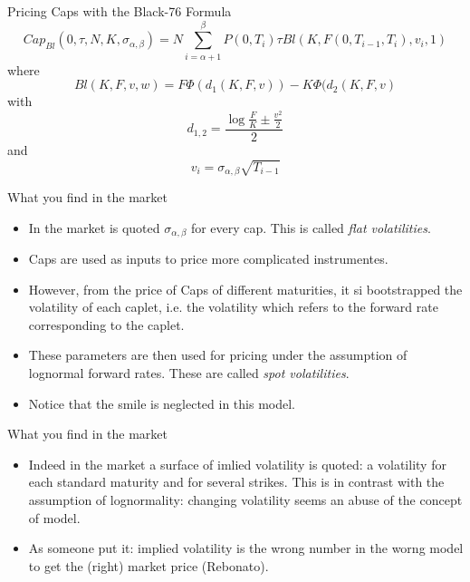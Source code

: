 \documentclass{beamer}
\begin{document}
\begin{frame}{Pricing Caps with the Black-76 Formula}
	\begin{equation}
		Cap_{Bl}(0, \tau,N,K,\sigma_{\alpha,\beta}) = N\sum_{i=\alpha+1}^{\beta}P(0,T_i)\tau Bl(K,F(0,T_{i-1},T_i),v_i,1)
	\end{equation}
	where
	\begin{equation}
		Bl(K,F,v,w)=F\Phi(d_1(K,F,v)) - K\Phi(d_2(K,F,v)
	\end{equation}
	with
	\begin{equation}
		d_{1,2} = \frac{\log{\frac{F}{K}} \pm \frac{v^2}{2}}{2}
	\end{equation}
	and
	\begin{equation}
		v_i = \sigma_{\alpha,\beta}\sqrt{T_{i-1}}	
	\end{equation}
\end{frame}


\begin{frame}{What you find in the market}
	\begin{itemize}
		\item In the market is quoted $\sigma_{\alpha,\beta}$ for every cap. This is called \emph{flat volatilities}.
		\item Caps are used as inputs to price more complicated instrumentes.
		\item However, from the price of Caps of different maturities, it si bootstrapped the volatility of each caplet, i.e. the volatility which refers to the forward rate corresponding to the caplet.
		\item These parameters are then used for pricing under the assumption of lognormal forward rates. These are called \emph{spot volatilities}.
		\item Notice that the smile is neglected in this model.
	\end{itemize}
\end{frame}


\begin{frame}{What you find in the market}
	\begin{itemize}
		\item Indeed in the market a surface of imlied volatility is quoted: a volatility for each standard maturity and for several strikes. This is in contrast with the assumption of lognormality: changing volatility seems an abuse of the concept of model.
		\item As someone put it: implied volatility is the wrong number in the worng model to get the (right) market price (Rebonato).
	\end{itemize}
\end{frame}
\end{document}
